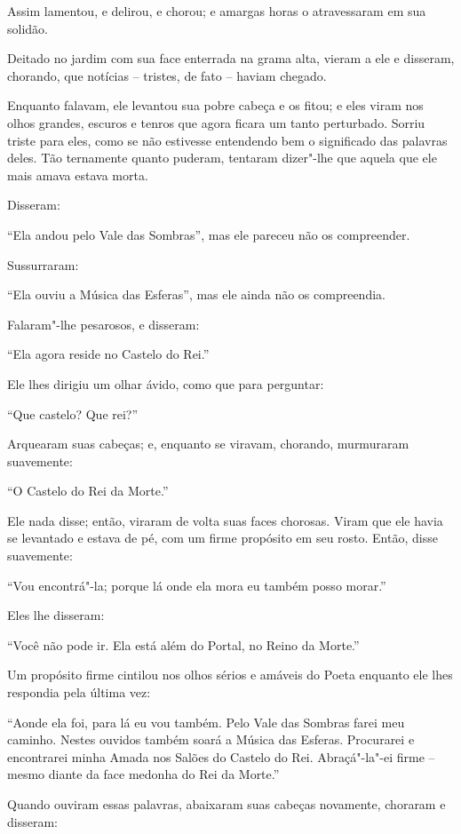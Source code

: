 Assim lamentou, e delirou, e chorou; e amargas horas o atravessaram
em sua solidão.

Deitado no jardim com sua face enterrada na grama alta,
vieram a ele e disseram, chorando, que notícias -- tristes, de fato --
haviam chegado.

Enquanto falavam, ele levantou sua pobre cabeça e os fitou; e eles viram
nos olhos grandes, escuros e tenros que agora ficara um tanto
perturbado. Sorriu triste para eles, como se não estivesse entendendo
bem o significado das palavras deles. Tão ternamente quanto puderam,
tentaram dizer"-lhe que aquela que ele mais amava estava morta.


Disseram:

``Ela andou pelo Vale das Sombras'', mas ele pareceu não os compreender.

Sussurraram:

``Ela ouviu a Música das Esferas'', mas ele ainda não os compreendia.

Falaram"-lhe pesarosos, e disseram:

``Ela agora reside no Castelo do Rei.''

Ele lhes dirigiu um olhar ávido, como que para perguntar:

``Que castelo? Que rei?''

Arquearam suas cabeças; e, enquanto se viravam, chorando, murmuraram
suavemente:

``O Castelo do Rei da Morte.''

Ele nada disse; então, viraram de volta suas faces chorosas. Viram que
ele havia se levantado e estava de pé, com um firme propósito em seu
rosto. Então, disse suavemente:

``Vou encontrá"-la; porque lá onde ela mora eu também posso morar.''

Eles lhe disseram:

``Você não pode ir. Ela está além do Portal, no Reino da Morte.''

Um propósito firme cintilou nos olhos sérios e amáveis do Poeta enquanto
ele lhes respondia pela última vez:

``Aonde ela foi, para lá eu vou também. Pelo Vale das Sombras farei meu
caminho. Nestes ouvidos também soará a Música das Esferas. Procurarei e
encontrarei minha Amada nos Salões do Castelo do Rei. Abraçá"-la"-ei firme
-- mesmo diante da face medonha do Rei da Morte.''

Quando ouviram essas palavras, abaixaram suas cabeças novamente,
choraram e disseram:

